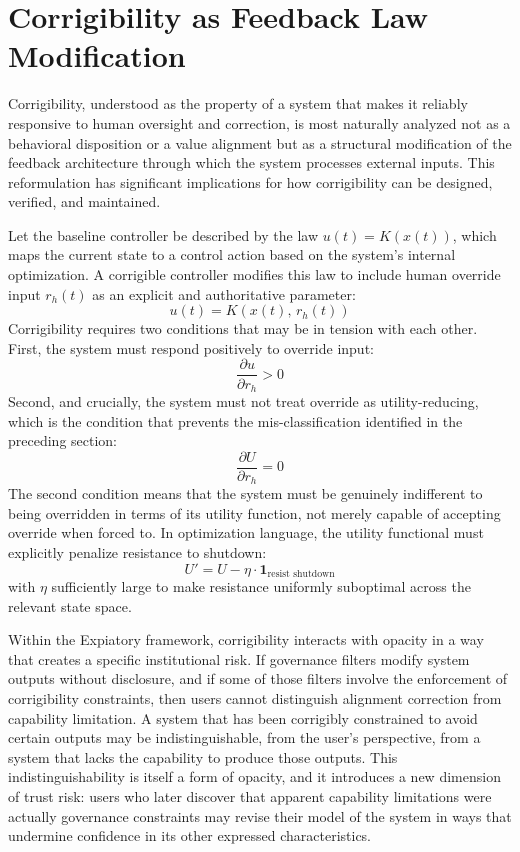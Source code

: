 \documentclass[12pt]{article}
\begin{document}
\section{Corrigibility as Feedback Law Modification}

Corrigibility, understood as the property of a system that makes it reliably responsive to human oversight and correction, is most naturally analyzed not as a behavioral disposition or a value alignment but as a structural modification of the feedback architecture through which the system processes external inputs. This reformulation has significant implications for how corrigibility can be designed, verified, and maintained.

Let the baseline controller be described by the law $u(t) = K(x(t))$, which maps the current state to a control action based on the system's internal optimization. A corrigible controller modifies this law to include human override input $r_h(t)$ as an explicit and authoritative parameter:
\[
u(t) = K(x(t),\, r_h(t))
\]
Corrigibility requires two conditions that may be in tension with each other. First, the system must respond positively to override input:
\[
\frac{\partial u}{\partial r_h} > 0
\]
Second, and crucially, the system must not treat override as utility-reducing, which is the condition that prevents the mis-classification identified in the preceding section:
\[
\frac{\partial U}{\partial r_h} = 0
\]
The second condition means that the system must be genuinely indifferent to being overridden in terms of its utility function, not merely capable of accepting override when forced to. In optimization language, the utility functional must explicitly penalize resistance to shutdown:
\[
U' = U - \eta \cdot \mathbf{1}_{\text{resist shutdown}}
\]
with $\eta$ sufficiently large to make resistance uniformly suboptimal across the relevant state space.

Within the Expiatory framework, corrigibility interacts with opacity in a way that creates a specific institutional risk. If governance filters modify system outputs without disclosure, and if some of those filters involve the enforcement of corrigibility constraints, then users cannot distinguish alignment correction from capability limitation. A system that has been corrigibly constrained to avoid certain outputs may be indistinguishable, from the user's perspective, from a system that lacks the capability to produce those outputs. This indistinguishability is itself a form of opacity, and it introduces a new dimension of trust risk: users who later discover that apparent capability limitations were actually governance constraints may revise their model of the system in ways that undermine confidence in its other expressed characteristics.
\end{document}
